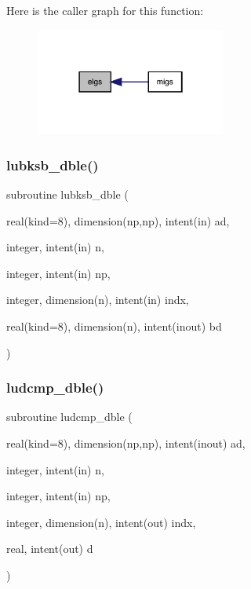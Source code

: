 Here is the caller graph for this function\+:
\nopagebreak
\begin{figure}[H]
\begin{center}
\leavevmode
\includegraphics[width=178pt]{bdf2__solver_8f90_a20b2b6c5902d735ebf45af8197ca2172_icgraph}
\end{center}
\end{figure}
\mbox{\label{bdf2__solver_8f90_a39e26f963dd59a961a595767eba16dc4}} 
\subsubsection{\texorpdfstring{lubksb\+\_\+dble()}{lubksb\_dble()}}
{\footnotesize\ttfamily subroutine lubksb\+\_\+dble (\begin{DoxyParamCaption}\item[{real(kind=8), dimension(np,np), intent(in)}]{ad,  }\item[{integer, intent(in)}]{n,  }\item[{integer, intent(in)}]{np,  }\item[{integer, dimension(n), intent(in)}]{indx,  }\item[{real(kind=8), dimension(n), intent(inout)}]{bd }\end{DoxyParamCaption})}

\mbox{\label{bdf2__solver_8f90_a552f7b3d1a9f5be9c86c45d03135d4b3}} 
\subsubsection{\texorpdfstring{ludcmp\+\_\+dble()}{ludcmp\_dble()}}
{\footnotesize\ttfamily subroutine ludcmp\+\_\+dble (\begin{DoxyParamCaption}\item[{real(kind=8), dimension(np,np), intent(inout)}]{ad,  }\item[{integer, intent(in)}]{n,  }\item[{integer, intent(in)}]{np,  }\item[{integer, dimension(n), intent(out)}]{indx,  }\item[{real, intent(out)}]{d }\end{DoxyParamCaption})}

